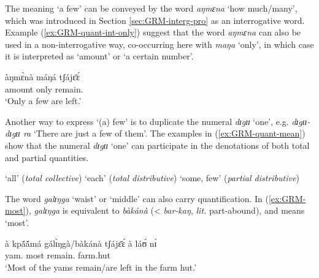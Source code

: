 \begin{exe}
\begin{exe}
\begin{exe}
{\begin{exe}
\begin{exe}
\begin{exe}
\begin{exe}
\begin{exe}
\begin{exe}
\begin{exe}
\begin{xlist}
\begin{exe}

The meaning `a few' can be conveyed by  the word {\it aŋmɛna} `how
much/many', which was introduced in Section \ref{sec:GRM-interg-pro} as an
interrogative
word. Example  
(\ref{ex:GRM-quant-int-only}) suggest that the word {\it aŋmɛna} can also be
used in a non-interrogative way,  co-occurring here with {\it maŋa} `only',  in
which case it is interpreted  as `amount' or `a certain number'.


\begin{exe}
 \ex\label{ex:GRM-quant-int-only}
\gll àŋmɛ̀nà máŋá tʃájɛ̄ɛ́\\
   amount only remain.{\pfv}\\
\glt `Only a few are left.'
\z

Another way to express `(a) few'  is to duplicate the numeral {\it dɪgɪɪ} `one',
e.g.
{\it dɪgɪɪ-dɪgɪɪ ra} `There are just a few of them'.  The  examples in 
(\ref{ex:GRM-quant-mean}) show that the numeral {\it dɪgɪɪ} `one' can
participate in the denotations of both total and partial quantities. 

\ea\label{ex:GRM-quant-mean}

  `all' ({\it total collective})
  `each' ({\it total distributive})
  `some, few' ({\it partial distributive})
 
\z 
 \z

The word {\it galɪŋga} `waist' or `middle'  can also carry quantification. In
(\ref{ex:GRM-most}),  {\it galɪŋga} is equivalent to {\it bàkánà} (< {\it 
bar-kaŋ},
{\it lit.} part-abound),  and means `most'.

\begin{exe}
 \ex\label{ex:GRM-most}
\gll   à kpã́ã́má  gálɪ̀ŋgà/bàkánà tʃájɛ̄ɛ́ à láʊ́ nɪ́\\
{\art} yam.{\pl} most remain.{\pfv} {\art} farm.hut {\postp}\\
\glt  `Most of the yams remain/are left in the farm hut.'
\z


\end{exe}
\end{exe}
\end{exe}
\end{xlist}
\end{exe}
\end{exe}
\end{exe}
\end{exe}
\end{exe}
\end{exe}
\end{exe}}
\end{exe}
\end{exe}
\end{exe}
